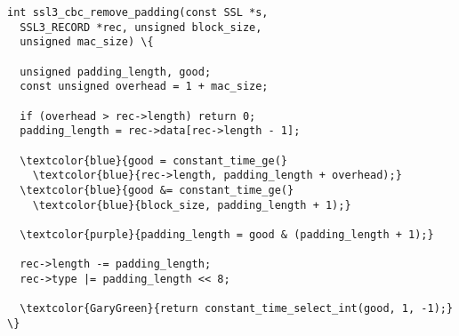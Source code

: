 \begin{minipage}[t]{3.1in}
\small
\begin{Verbatim}
int ssl3_cbc_remove_padding(const SSL *s, 
  SSL3_RECORD *rec, unsigned block_size, 
  unsigned mac_size) \{
 
  unsigned padding_length, good;
  const unsigned overhead = 1 + mac_size;

  if (overhead > rec->length) return 0;
  padding_length = rec->data[rec->length - 1];

  \textcolor{blue}{good = constant_time_ge(}
    \textcolor{blue}{rec->length, padding_length + overhead);}
  \textcolor{blue}{good &= constant_time_ge(}
    \textcolor{blue}{block_size, padding_length + 1);}

  \textcolor{purple}{padding_length = good & (padding_length + 1);}

  rec->length -= padding_length;
  rec->type |= padding_length << 8;

  \textcolor{GaryGreen}{return constant_time_select_int(good, 1, -1);}
\}
\end{Verbatim}
\end{minipage}
